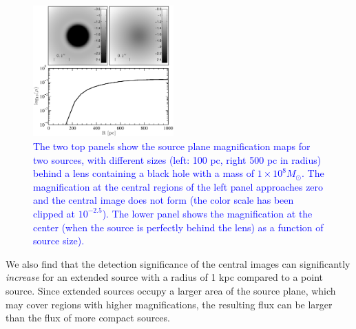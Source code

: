 \documentclass[chicago]{emulateapj}
\newcommand{\blue}{\textcolor{blue}}
\begin{document}
\begin{figure}
\begin{center}
\centering
\includegraphics[trim= 0 0 0 0, clip, width=0.48\textwidth]{figures/f_06.eps}
\centering
\end{center}
\vspace{-1mm}
\caption{\blue{The two top panels show the source plane magnification 
maps for two sources, with different sizes (left: 100 pc, 
right 500 pc in radius) behind a lens containing a black hole with 
a mass of $1\times 10^8 M_{\odot}$. The magnification at the 
central regions of the left panel approaches zero and the central 
image does not form (the color scale has been clipped at 
$10^{-2.5}$). The lower panel shows the magnification at the center 
(when the source is perfectly behind the lens) as a function of 
source size).}
\label{figMu}}
\vspace{-1.5mm}
\end{figure}


We also find that the detection significance of the central images 
can significantly \emph{increase} for an extended source with a 
radius of 1 kpc compared to a point source. Since extended sources 
occupy a larger area of the source plane, which may cover regions 
with higher magnifications, the resulting flux can be larger than 
the flux of more compact sources.
\end{document}
